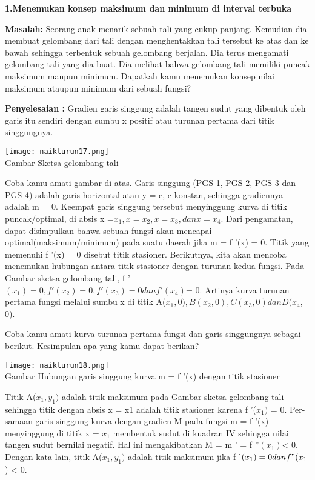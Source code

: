 \documentclass[11pt,fleqn]{book} %
\begin{document}
\textbf{1.Menemukan konsep maksimum dan minimum di interval terbuka}

\textbf{Masalah: }
Seorang anak menarik sebuah tali yang cukup
panjang. Kemudian dia membuat gelombang dari
tali dengan menghentakkan tali tersebut ke atas dan
ke bawah sehingga terbentuk sebuah gelombang
berjalan. Dia terus mengamati gelombang tali yang
dia buat. Dia melihat bahwa gelombang tali memiliki
puncak maksimum maupun minimum. Dapatkah
kamu menemukan konsep nilai maksimum ataupun
minimum dari sebuah fungsi?

\textbf{Penyelesaian :}
Gradien garis singgung adalah tangen sudut yang
dibentuk oleh garis itu sendiri dengan sumbu x positif atau turunan pertama dari titik singgungnya.

\begin{center}
\texttt{[image: naikturun17.png]}\\
Gambar Sketsa gelombang tali
\end{center}

Coba kamu amati gambar di atas. Garis singgung
(PGS 1, PGS 2, PGS 3 dan PGS 4) adalah garis horizontal atau y = c, c konstan, sehingga gradiennya
adalah m = 0. Keempat garis singgung tersebut menyinggung kurva di titik puncak/optimal, di absis x =$ x_{1}, x = x_{2}, x = x_{3}, dan x = x_{4}$. Dari pengamatan, dapat disimpulkan bahwa sebuah fungsi akan mencapai optimal(maksimum/minimum) pada suatu daerah jika m = f '(x) = 0. Titik yang memenuhi f '(x) = 0 disebut titik stasioner. Berikutnya, kita akan mencoba menemukan hubungan antara titik stasioner dengan turunan kedua fungsi. Pada Gambar sketsa gelombang tali, f '$(x_{1}) = 0, f '(x_{2}) = 0, f '(x_{3}) = 0 dan f '(x_{4}) $= 0. Artinya kurva turunan pertama fungsi melalui sumbu x di titik A($x_{1}, 0), B(x_{2}, 0), C(x_{3}, 0) dan D(x_{4}$, 0).

Coba kamu amati kurva turunan pertama fungsi dan
garis singgungnya sebagai berikut. Kesimpulan apa
yang kamu dapat berikan?

\begin{center}
\texttt{[image: naikturun18.png]}\\
Gambar Hubungan garis singgung kurva m = f '(x)
dengan titik stasioner
\end{center}

Titik A($x_{1}, y_{1})$ adalah titik maksimum pada Gambar sketsa gelombang tali sehingga titik dengan absis x = x1 adalah titik stasioner karena f '($x_{1})$ = 0. Per-samaan garis singgung kurva dengan gradien M pada fungsi m = f '(x) menyinggung di titik x = $x_{1}$ membentuk sudut di kuadran IV sehingga nilai tangen sudut bernilai negatif. Hal ini mengakibatkan M = m ' = f ''$(x_{1}) $< 0. Dengan kata lain, titik A($x_{1}, y_{1})$ adalah titik maksimum jika f '$(x_{1}) = 0 dan f "(x_{1}$) < 0.
\end{document}
